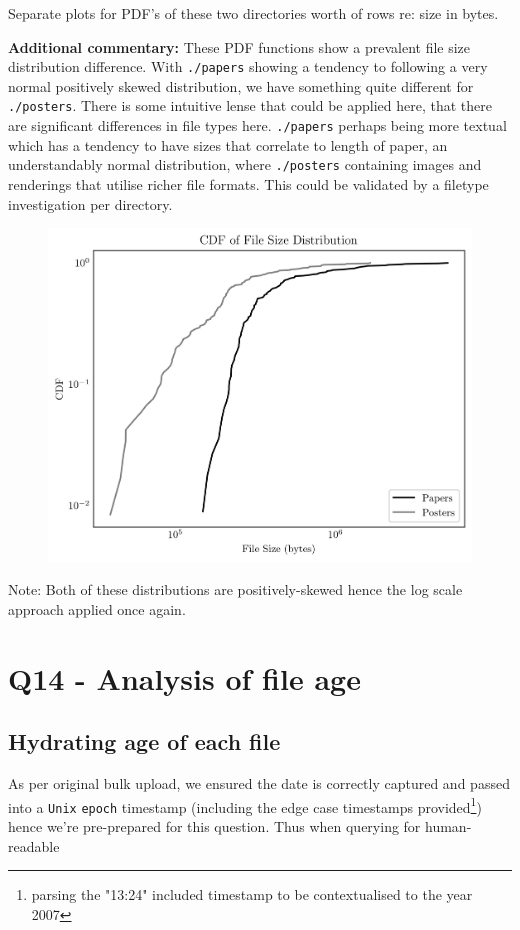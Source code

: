 \documentclass{article}
\begin{document}
Separate plots for PDF's of these two directories worth of rows re: size in bytes.

\textbf{Additional commentary:} These PDF functions show a prevalent file size distribution difference. With \texttt{./papers} showing a tendency to following a very normal positively skewed distribution, we have something quite different for \texttt{./posters}. There is some intuitive lense that could be applied here, that there are significant differences in file types here. \texttt{./papers} perhaps being more textual which has a tendency to have sizes that correlate to length of paper, an understandably normal distribution, where \texttt{./posters} containing images and renderings that utilise richer file formats. This could be validated by a filetype investigation per directory.

\newpage

\begin{figure}[htbp]
\centering
\includegraphics[width=\linewidth]{./images/papers_posters_size_cdf.png}
\end{figure}

Note: Both of these distributions are positively-skewed hence the log scale approach applied once again.

\newpage
\section*{Q14 - Analysis of file age}
\subsection*{Hydrating age of each file}
As per original bulk upload, we ensured the date is correctly captured and passed into a \texttt{Unix} \texttt{epoch} timestamp (including the edge case timestamps provided\footnote{parsing the "13:24" included timestamp to be contextualised to the year 2007}) hence we're pre-prepared for this question. Thus when querying for human-readable
\end{document}
